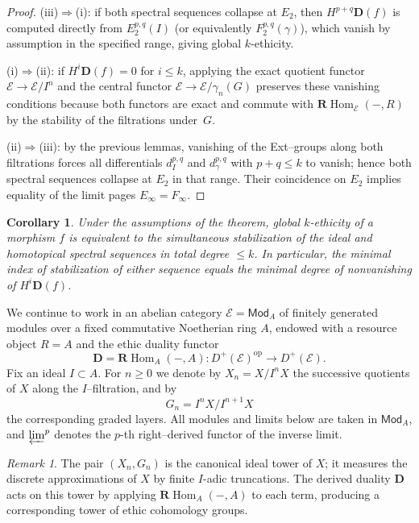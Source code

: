 \documentclass[12pt]{article}
\newcommand{\E}{\mathcal{E}}
\newcommand{\Mod}{\mathsf{Mod}}
\newcommand{\op}{\mathrm{op}}
\newcommand{\RHom}{\mathbf{R}\!\operatorname{Hom}}
\theoremstyle{plain}
\newtheorem{corollary}[theorem]{Corollary}
\theoremstyle{definition}
\theoremstyle{remark}
\newtheorem{remark}[theorem]{Remark}
\numberwithin{equation}{section}
\begin{document}
\begin{proof}
(iii)\(\Rightarrow\)(i): if both spectral sequences collapse at \(E_2\),
then \(H^{p+q}\mathbf D(f)\) is computed directly from \(E^{p,q}_2(I)\) (or equivalently \(F^{p,q}_2(\gamma)\)), which vanish by assumption in the specified range, giving global \(k\)-ethicity.  

(i)\(\Rightarrow\)(ii): if \(H^i\mathbf D(f)=0\) for \(i\le k\), applying the exact quotient functor \(\E\to\E/I^n\) and the central functor \(\E\to\E/\gamma_n(G)\) preserves these vanishing conditions because both functors are exact and commute with \(\RHom_\E(-,R)\) by the stability of the filtrations under~\(G\).  

(ii)\(\Rightarrow\)(iii): by the previous lemmas, vanishing of the Ext–groups along both filtrations forces all differentials \(d_I^{p,q}\) and \(d_\gamma^{p,q}\) with \(p+q\le k\) to vanish; hence both spectral sequences collapse at \(E_2\) in that range. Their coincidence on \(E_2\) implies equality of the limit pages \(E_\infty=F_\infty\).  
\end{proof}

\begin{corollary}
Under the assumptions of the theorem, global \(k\)-ethicity of a morphism \(f\) is equivalent to the simultaneous stabilization of the ideal and homotopical spectral sequences in total degree \(\le k\). In particular, the minimal index of stabilization of either sequence equals the minimal degree of nonvanishing of \(H^i\mathbf D(f)\).
\end{corollary}

We continue to work in an abelian category \(\E=\Mod_A\) of finitely generated modules over a fixed commutative Noetherian ring \(A\), endowed with a resource object \(R=A\) and the ethic duality functor
\[
\mathbf D = \RHom_A(-,A): D^+(\E)^{\op}\longrightarrow D^+(\E).
\]
Fix an ideal \(I\subset A\). For \(n\ge0\) we denote by \(X_n=X/I^nX\) the successive quotients of \(X\) along the \(I\)–filtration, and by
\[
G_n = I^nX/I^{n+1}X
\]
the corresponding graded layers.
All modules and limits below are taken in \(\Mod_A\), and \(\varprojlim^p\) denotes the \(p\)-th right–derived functor of the inverse limit.

\begin{remark}
The pair \((X_n,G_n)\) is the canonical ideal tower of \(X\); it measures the discrete approximations of \(X\) by finite \(I\)-adic truncations.
The derived duality \(\mathbf D\) acts on this tower by applying \(\RHom_A(-,A)\) to each term, producing a corresponding tower of ethic cohomology groups.
\end{remark}
\end{document}

